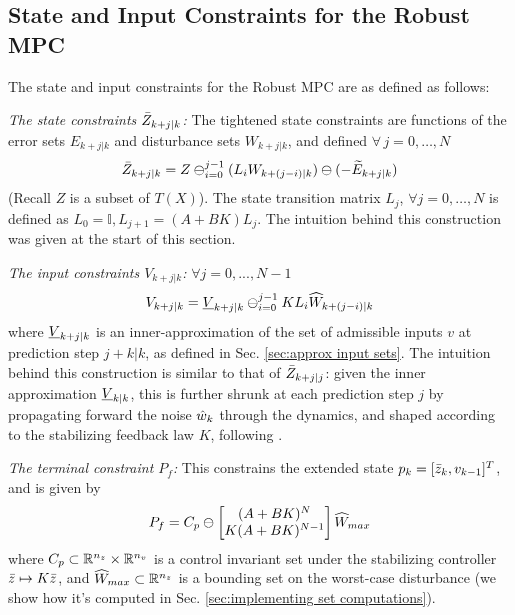\subsection{State and Input Constraints for the Robust MPC}
\label{sec:Constraints}
The state and input constraints for the Robust MPC are as defined as follows:

\textit{The state constraints $\bar{Z}_{k+j|k}$:}
The tightened state constraints are functions of the error sets $E_{k+j|k}$ and disturbance sets $W_{k+j|k}$, and defined $\forall\,j=0,\dotsc,N$
{\small{
\begin{equation} 
\label{eq:Set_constraints}
\bar{Z}_{k+j|k} = Z \ominus_{i=0}^{j-1}(L_iW_{k+(j-i)|k})\ominus (-\widetilde{E}_{k+j|k})
\end{equation}
}}
(Recall $Z$ is a subset of $T(X)$).
The state transition matrix $L_j$, $\forall j=0,\dotsc,N$   is defined as $L_0 = \mathbb{I}, L_{j+1} = (A+BK)L_j $.
The intuition behind this construction was given at the start of this section.

\textit{The input constraints $V_{k+j|k}$:}
$\forall j=0,...,N-1$
\begin{equation} 
\label{eq:input_constraints}
V_{k+j|k} = \underline{V}_{k+j|k} \ominus_{i=0}^{j-1}KL_i\widehat{W}_{k+(j-i)|k} 
\end{equation}
where $\underline{V}_{k+j|k} $ is an inner-approximation of the set of admissible inputs $v$ at prediction step $j+k|k$, as defined in Sec. \ref{sec:approx input sets}.
The intuition behind this construction is similar to that of $\bar{Z}_{k+j|j}$: given the inner approximation $\underline{V}_{k|k} $, this is further shrunk at each prediction step $j$ by propagating forward the noise $\hat{w}_k$ through the dynamics, and shaped according to the stabilizing feedback law $K$, following \cite{RichardsH05_RMPC}.

\textit{The terminal constraint $P_f$:}
This constrains the extended state $p_k = [\bar{z}_{k}, v_{k-1}]^T$, and is given by 
\begin{equation}
\label{eq:P_f_def}
P_f = C_p\ominus \left\lbrack \begin{matrix} (A+BK)^N \\ K(A+BK)^{N-1}\end{matrix} \right \rbrack \widehat{W}_{max}
\end{equation}
where $C_p \subset \mathbb{R}^{n_z}\times \mathbb{R}^{n_v}$ is a control invariant set under the stabilizing controller $\bar{z} \mapsto K\bar{z}$, 
and $\widehat{W}_{max} \subset \mathbb{R}^{n_z}$ is a bounding set on the worst-case disturbance (we show how it's computed in Sec. \ref{sec:implementing set computations}).

